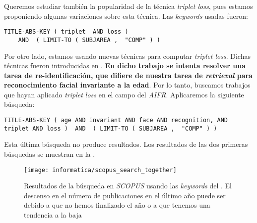 Queremos estudiar también la popularidad de la técnica \textit{triplet loss}, pues estamos proponiendo algunas variaciones sobre esta técnica. Las \textit{keywords} usadas fueron:

\begin{lstlisting}[caption=\textit{Keywords usadas para la búsqueda en \textit{SCOPUS} para consultar la popularidad del \textit{triplet loss}. Búsqueda realizada el 17 de Septiembre de 2023}, label=code:scopus_search_tripletloss, captionpos=b]
    TITLE-ABS-KEY ( triplet  AND loss )
    AND  ( LIMIT-TO ( SUBJAREA ,  "COMP" ) )
\end{lstlisting}

Por otro lado, estamos usando nuevas técnicas para computar \textit{triplet loss}. Dichas técnicas fueron introducidas en \cite{informatica:principal}. \textbf{En dicho trabajo se intenta resolver una tarea de re-identificación, que difiere de nuestra tarea de \textit{retrieval} para reconocimiento facial invariante a la edad}. Por lo tanto, buscamos trabajos que hayan aplicado \textit{triplet loss} en el campo del \textit{AIFR}. Aplicaremos la siguiente búsqueda:

\begin{lstlisting}[caption=Keywords usandos para la búsqueda de trabajos que combinen \textit{AIFR} y \textit{triplet loss} en \textit{SCOPUS}, label=code:scopus_search_especifico, captionpos=b]
    TITLE-ABS-KEY ( age AND invariant AND face AND recognition, AND triplet AND loss )  AND  ( LIMIT-TO ( SUBJAREA ,  "COMP" ) )
\end{lstlisting}

Esta última búsqueda no produce resultados. Los resultados de las dos primeras búsquedas se muestran en la .

\begin{figure}[!hbtp]
	\centering
	\texttt{[image: informatica/scopus\_search\_together]}
	\caption{Resultados de la búsqueda en \textit{SCOPUS} usando las \textit{keywords} del . El descenso en el número de publicaciones en el último año puede ser debido a que no hemos finalizado el año o a que tenemos una tendencia a la baja}
	\label{img:scopus_together}
\end{figure}

